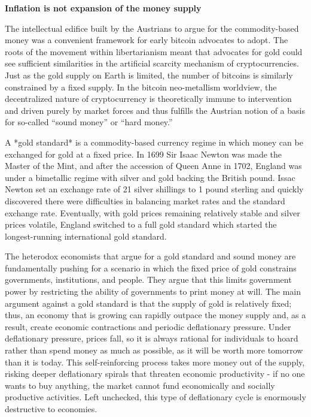\begin{infobox}
 \textbf{Inflation is not expansion of the money supply}
\end{infobox}


The intellectual edifice built by the Austrians to argue for the commodity-based
money was a convenient framework for early bitcoin advocates to adopt. The roots
of the movement within libertarianism meant that advocates for gold could see
sufficient similarities in the artificial scarcity mechanism of
cryptocurrencies. Just as the gold supply on Earth is limited, the number of
bitcoins is similarly constrained by a fixed supply. In the bitcoin
neo-metallism worldview, the decentralized nature of cryptocurrency is
theoretically immune to intervention and driven purely by market forces and thus
fulfills the Austrian notion of a basis for so-called ``sound money'' or ``hard
money.''


A *gold standard* is a commodity-based currency regime in which money can be
exchanged for gold at a fixed price. In 1699 Sir Isaac Newton was made the
Master of the Mint, and after the accession of Queen Anne in 1702, England was
under a bimetallic regime with silver and gold backing the British pound. Issac
Newton set an exchange rate of 21 silver shillings to 1 pound sterling and
quickly discovered there were difficulties in balancing market rates and the
standard exchange rate. Eventually, with gold prices remaining relatively stable
and silver prices volatile, England switched to a full gold standard which
started the longest-running international gold standard.


The heterodox economists that argue for a gold standard and sound money are
fundamentally pushing for a scenario in which the fixed price of gold constrains
governments, institutions, and people. They argue that this limits government
power by restricting the ability of governments to print money at will. The main
argument against a gold standard is that the supply of gold is relatively fixed;
thus, an economy that is growing can rapidly outpace the money supply and, as a
result, create economic contractions and periodic deflationary pressure. Under
deflationary pressure, prices fall, so it is always rational for individuals to
hoard rather than spend money as much as possible, as it will be worth more
tomorrow than it is today. This self-reinforcing process takes more money out of
the supply, risking deeper deflationary spirals that threaten economic
productivity - if no one wants to buy anything, the market cannot fund
economically and socially productive activities. Left unchecked, this type of
deflationary cycle is enormously destructive to economies.

